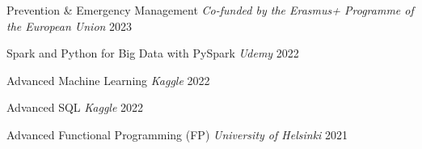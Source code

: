 

\begin{cvhonors}

  \cvhonor
    {Prevention \& Emergency Management} %
    {\textit{Co-funded by the Erasmus+ Programme of the European Union}
    } %
    {
    } %
    {2023} %

  \cvhonor
    {Spark and Python for Big Data with PySpark} %
    {\textit{Udemy}} %
    {} %
    {2022} %

  \cvhonor
    {Advanced Machine Learning} %
    {\textit{Kaggle}} %
    {} %
    {2022} %

  \cvhonor
    {Advanced SQL} %
    {\textit{Kaggle}} %
    {} %
    {2022} %

  \cvhonor
    {Advanced Functional Programming (FP)} %
    {\textit{University of Helsinki}} %
    {} %
    {2021} %

\end{cvhonors}
